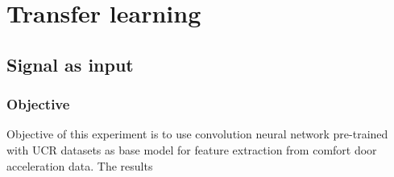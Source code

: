    
   \chapter{Transfer learning}
   
   \section{Signal as input}
   
   \subsection{Objective}
   
   Objective of this experiment is to use convolution neural network pre-trained with UCR datasets as base model for feature extraction from comfort door acceleration data. 
   The results 
       

